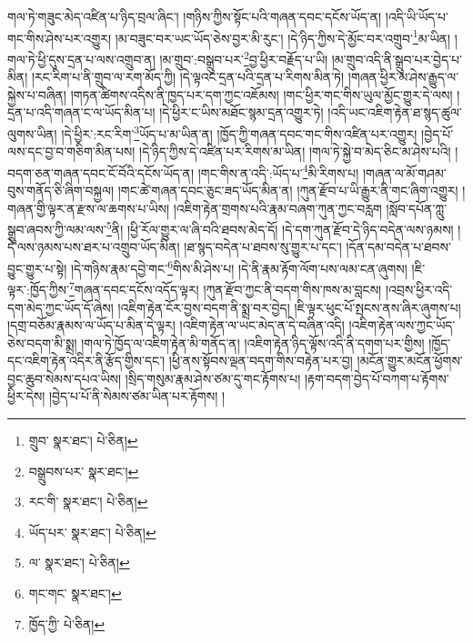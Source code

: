 གལ་ཏེ་གཟུང་མེད་འཛིན་པ་ཉིད་བྲལ་ཞིང་། །གཉིས་ཀྱིས་སྟོང་པའི་གཞན་དབང་དངོས་ཡོད་ན། །འདི་ཡི་ཡོད་པ་གང་གིས་ཤེས་པར་འགྱུར། །མ་བཟུང་བར་ཡང་ཡོད་ཅེས་བྱར་མི་རུང་། །དེ་ཉིད་ཀྱིས་དེ་མྱོང་བར་འགྲུབ་\footnote{གྲུབ་  སྣར་ཐང་།  པེ་ཅིན། }མ་ཡིན། །གལ་ཏེ་ཕྱི་དུས་དྲན་པ་ལས་འགྲུབ་ན། །མ་གྲུབ་:བསྒྲུབ་པར་\footnote{བསྒྲུབས་པར་  སྣར་ཐང་། }བྱ་ཕྱིར་བརྗོད་པ་ཡི། །མ་གྲུབ་འདི་ནི་སྒྲུབ་པར་བྱེད་པ་མིན། །རང་རིག་པ་ནི་གྲུབ་ལ་རག་མོད་ཀྱི། །དེ་ལྟའང་དྲན་པའི་དྲན་པ་རིགས་མིན་ཏེ། །གཞན་ཕྱིར་མ་ཤེས་རྒྱུད་ལ་སྐྱེས་པ་བཞིན། །གཏན་ཚིགས་འདིས་ནི་ཁྱད་པར་དག་ཀྱང་འཇོམས། །གང་ཕྱིར་གང་གིས་ཡུལ་མྱོང་གྱུར་དེ་ལས། །དྲན་པ་འདི་གཞན་ང་ལ་ཡོད་མིན་པ། །དེ་ཕྱིར་ང་ཡིས་མཐོང་སྙམ་དྲན་འགྱུར་ཏེ། །འདི་ཡང་འཇིག་རྟེན་ཐ་སྙད་ཚུལ་ལུགས་ཡིན། །དེ་ཕྱིར་:རང་རིག་\footnote{རང་གི་  སྣར་ཐང་།  པེ་ཅིན། }ཡོད་པ་མ་ཡིན་ན། །ཁྱོད་ཀྱི་གཞན་དབང་གང་གིས་འཛིན་པར་འགྱུར། །བྱེད་པོ་ལས་དང་བྱ་བ་གཅིག་མིན་པས། །དེ་ཉིད་ཀྱིས་དེ་འཛིན་པར་རིགས་མ་ཡིན། །གལ་ཏེ་སྐྱེ་བ་མེད་ཅིང་མ་ཤེས་པའི། །བདག་ཅན་གཞན་དབང་ངོ་བོའི་དངོས་ཡོད་ན། །གང་གིས་ན་འདི་:ཡོད་པ་\footnote{ཡོད་པར་  སྣར་ཐང་།  པེ་ཅིན། }མི་རིགས་པ། །གཞན་ལ་མོ་གཤམ་བུས་གནོད་ཅི་ཞིག་བསྐྱལ། །གང་ཚེ་གཞན་དབང་ཅུང་ཟད་ཡོད་མིན་ན། །ཀུན་རྫོབ་པ་ཡི་རྒྱུར་ནི་གང་ཞིག་འགྱུར། །གཞན་གྱི་ལྟར་ན་རྫས་ལ་ཆགས་པ་ཡིས། །འཇིག་རྟེན་གྲགས་པའི་རྣམ་བཞག་ཀུན་ཀྱང་བརླག །སློབ་དཔོན་ཀླུ་སྒྲུབ་ཞབས་ཀྱི་ལམ་ལས་\footnote{ལ་  སྣར་ཐང་།  པེ་ཅིན། }ནི། །ཕྱི་རོལ་གྱུར་ལ་ཞི་བའི་ཐབས་མེད་དོ། །དེ་དག་ཀུན་རྫོབ་དེ་ཉིད་བདེན་ལས་ཉམས། །དེ་ལས་ཉམས་པས་ཐར་པ་འགྲུབ་ཡོད་མིན། །ཐ་སྙད་བདེན་པ་ཐབས་སུ་གྱུར་པ་དང་། །དོན་དམ་བདེན་པ་ཐབས་བྱུང་གྱུར་པ་སྟེ། །དེ་གཉིས་རྣམ་དབྱེ་གང་\footnote{གང་གང་  སྣར་ཐང་། }གིས་མི་ཤེས་པ། །དེ་ནི་རྣམ་རྟོག་ལོག་པས་ལམ་ངན་ཞུགས། །ཇི་ལྟར་:ཁྱོད་ཀྱིས་\footnote{ཁྱོད་ཀྱི་  པེ་ཅིན། }གཞན་དབང་དངོས་འདོད་ལྟར། །ཀུན་རྫོབ་ཀྱང་ནི་བདག་གིས་ཁས་མ་བླངས། །འབྲས་ཕྱིར་འདི་དག་མེད་ཀྱང་ཡོད་དོ་ཞེས། །འཇིག་རྟེན་ངོར་བྱས་བདག་ནི་སྨྲ་བར་བྱེད། །ཇི་ལྟར་ཕུང་པོ་སྤངས་ནས་ཞིར་ཞུགས་པ། །དགྲ་བཅོམ་རྣམས་ལ་ཡོད་པ་མིན་དེ་ལྟར། །འཇིག་རྟེན་ལ་ཡང་མེད་ན་དེ་བཞིན་འདི། །འཇིག་རྟེན་ལས་ཀྱང་ཡོད་ཅེས་བདག་མི་སྨྲ། །གལ་ཏེ་ཁྱོད་ལ་འཇིག་རྟེན་མི་གནོད་ན། །འཇིག་རྟེན་ཉིད་ལྟོས་འདི་ནི་དགག་པར་གྱིས། །ཁྱོད་དང་འཇིག་རྟེན་འདིར་ནི་རྩོད་གྱིས་དང་། །ཕྱི་ནས་སྟོབས་ལྡན་བདག་གིས་བརྟེན་པར་བྱ། །མངོན་གྱུར་མངོན་ཕྱོགས་བྱང་ཆུབ་སེམས་དཔའ་ཡིས། །སྲིད་གསུམ་རྣམ་ཤེས་ཙམ་དུ་གང་རྟོགས་པ། །རྟག་བདག་བྱེད་པོ་བཀག་པ་རྟོགས་ཕྱིར་དེས། །བྱེད་པ་པོ་ནི་སེམས་ཙམ་ཡིན་པར་རྟོགས། །
